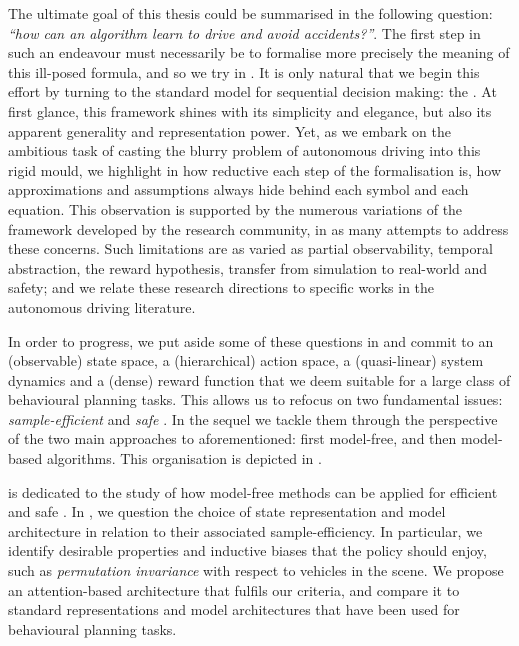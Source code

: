 The ultimate goal of this thesis could be summarised in the following question: \emph{\enquote{how can an algorithm learn to drive and avoid accidents?}}. The first step in such an endeavour must necessarily be to formalise more precisely the meaning of this ill-posed formula, and so we try in \textbf{}.
It is only natural that we begin this effort by turning to the standard model for sequential decision making: the . At first glance, this framework shines with its simplicity and elegance, but also its apparent generality and representation power. Yet, as we embark on the ambitious task of casting the blurry problem of autonomous driving into this rigid mould, we highlight in \textbf{} how reductive each step of the formalisation is, how approximations and assumptions always hide behind each symbol and each equation. This observation is supported by the numerous variations of the framework developed by the research community, in as many attempts to address these concerns. Such limitations are as varied as partial observability, temporal abstraction, the reward hypothesis, transfer from simulation to real-world and safety; and we relate these research directions to specific works in the autonomous driving literature.

In order to progress, we put aside some of these questions in \textbf{} and commit to an (observable) state space, a (hierarchical) action space, a (quasi-linear) system dynamics and a (dense) reward function that we deem suitable for a large class of behavioural planning tasks. This allows us to refocus on two fundamental issues: \textit{sample-efficient} and \textit{safe} . In the sequel we tackle them through the perspective of the two main approaches to  aforementioned: first model-free, and then model-based algorithms. This organisation is depicted in .

\textbf{} is dedicated to the study of how model-free methods can be applied for efficient and safe . In \textbf{}, we question the choice of state representation and model architecture in relation to their associated sample-efficiency. In particular, we identify desirable properties and inductive biases that the policy should enjoy, such as \emph{permutation invariance} with respect to vehicles in the scene. We propose an attention-based architecture that fulfils our criteria, and compare it to standard representations and model architectures that have been used for behavioural planning tasks. 

